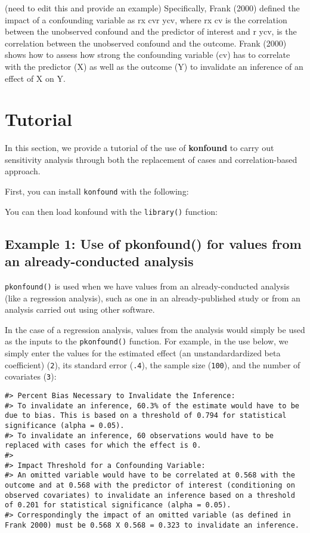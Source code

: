 \documentclass[man]{apa6}
\begin{document}
(need to edit this and provide an example) Specifically, Frank (2000)
defined the impact of a confounding variable as rx cvr ycv, where rx cv
is the correlation between the unobserved confound and the predictor of
interest and r ycv, is the correlation between the unobserved confound
and the outcome. Frank (2000) shows how to assess how strong the
confounding variable (cv) has to correlate with the predictor (X) as
well as the outcome (Y) to invalidate an inference of an effect of X on
Y.

\section{Tutorial}\label{tutorial}

In this section, we provide a tutorial of the use of \textbf{konfound}
to carry out sensitivity analysis through both the replacement of cases
and correlation-based approach.

First, you can install \texttt{konfound} with the following:

You can then load konfound with the \texttt{library()} function:

\subsection{Example 1: Use of pkonfound() for values from an
already-conducted
analysis}\label{example-1-use-of-pkonfound-for-values-from-an-already-conducted-analysis}

\texttt{pkonfound()} is used when we have values from an
already-conducted analysis (like a regression analysis), such as one in
an already-published study or from an analysis carried out using other
software.

In the case of a regression analysis, values from the analysis would
simply be used as the inputs to the \texttt{pkonfound()} function. For
example, in the use below, we simply enter the values for the estimated
effect (an unstandardardized beta coefficient) (\texttt{2}), its
standard error (\texttt{.4}), the sample size (\texttt{100}), and the
number of covariates (\texttt{3}):

\begin{verbatim}
#> Percent Bias Necessary to Invalidate the Inference:
#> To invalidate an inference, 60.3% of the estimate would have to be due to bias. This is based on a threshold of 0.794 for statistical significance (alpha = 0.05).
#> To invalidate an inference, 60 observations would have to be replaced with cases for which the effect is 0.
#> 
#> Impact Threshold for a Confounding Variable:
#> An omitted variable would have to be correlated at 0.568 with the outcome and at 0.568 with the predictor of interest (conditioning on observed covariates) to invalidate an inference based on a threshold of 0.201 for statistical significance (alpha = 0.05).
#> Correspondingly the impact of an omitted variable (as defined in Frank 2000) must be 0.568 X 0.568 = 0.323 to invalidate an inference.
\end{verbatim}
\end{document}
